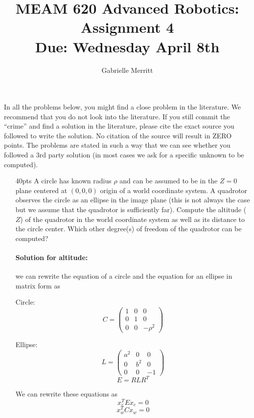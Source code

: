 \documentclass[11pt,english]{article}
\title{MEAM 620 Advanced Robotics: Assignment 4\\
Due:  Wednesday April 8th}
\author{Gabrielle Merritt}
\date{}
\begin{document}
\maketitle
In all the problems below, you might find a close problem in the literature. We recommend that you do not look into the literature. If you still commit the ``crime'' and find a solution in the literature, please cite the exact source you followed to write the solution. 
No citation of the source will result in ZERO points. The problems are stated in such a way that we can see whether you followed a 3rd party solution (in most cases we ask for a specific unknown to be computed).


\begin{enumerate}

\item [40pts]
 A circle has known radius $\rho$ and can be assumed to be in the $Z=0$ plane centered at $(0,0,0)$ origin of a world coordinate system. A quadrotor observes the circle as an ellipse in the image plane (this is not always the case but we assume that the quadrotor is sufficiently far). Compute the altitude ($Z$) of the quadrotor in the world coordinate system as well as its distance to the circle center. 
Which other degree(s) of freedom of the quadrotor can be computed?

\paragraph{Solution for altitude:}

we can rewrite the equation of a circle and the equation for an ellipse in matrix form as 

Circle: 
\begin{equation}
C = \begin{pmatrix}
1 & 0 & 0 \\ 
0&1&0 \\ 
0&0& -\rho^2 
\end{pmatrix}
\end{equation}

Ellipse: 
$$
L = \begin{pmatrix}
a^2& 0 & 0 \\ 
0&b^2&0 \\ 
0&0& -1 
\end{pmatrix}
$$
$$
E = R L R^T
$$

We can rewrite these equations as 
\begin{equation}
x_c^T E x_c = 0 
\end{equation}
\begin{equation}
x_w^T C x_w = 0
\end{equation}



\end{enumerate}
\end{document}
